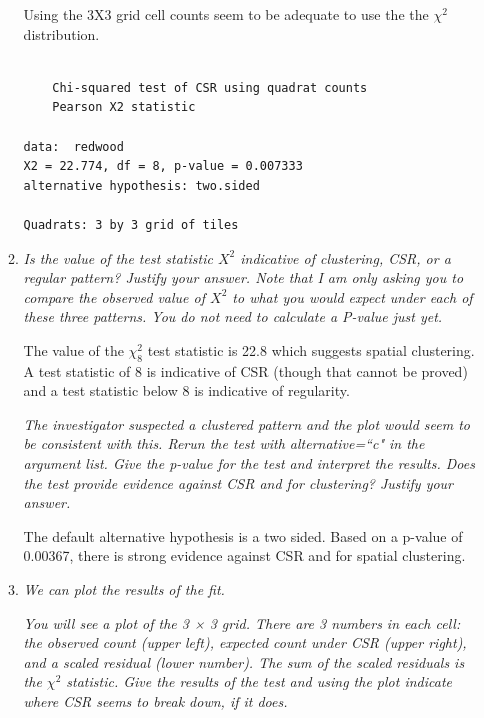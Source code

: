 \documentclass{article}\usepackage[]{graphicx}\usepackage[]{color}
\makeatletter
\newenvironment{kframe}{%
 \def\at@end@of@kframe{}%
 \ifinner\ifhmode%
  \def\at@end@of@kframe{\end{minipage}}%
  \begin{minipage}{\columnwidth}%
 \fi\fi%
 \def\FrameCommand##1{\hskip\@totalleftmargin \hskip-\fboxsep
 \colorbox{shadecolor}{##1}\hskip-\fboxsep
     \hskip-\linewidth \hskip-\@totalleftmargin \hskip\columnwidth}%
 \MakeFramed {\advance\hsize-\width
   \@totalleftmargin\z@ \linewidth\hsize
   \@setminipage}}%
 {\par\unskip\endMakeFramed%
 \at@end@of@kframe}
\newenvironment{knitrout}{}{} %
\makeatother
\begin{document}
\begin{enumerate}
\begin{enumerate}
Using the 3X3 grid cell counts seem to be adequate to use the the $\chi^{2}$ distribution.

\begin{knitrout}\footnotesize
{}\color{fgcolor}\begin{kframe}
\begin{verbatim}

	Chi-squared test of CSR using quadrat counts
	Pearson X2 statistic

data:  redwood
X2 = 22.774, df = 8, p-value = 0.007333
alternative hypothesis: two.sided

Quadrats: 3 by 3 grid of tiles
\end{verbatim}
\end{kframe}
\end{knitrout}

\item {\it Is the value of the test statistic $X^2$ indicative of clustering, CSR, or a regular pattern? Justify your answer. Note that I am only asking you to compare the observed value of $X^2$ to what you would expect under each of these three patterns. You do not need to calculate a P-value just yet.}

The value of the $\chi^{2}_{8}$ test statistic is 22.8 which suggests spatial clustering. A test statistic of 8 is indicative of CSR (though that cannot be proved) and a test statistic below 8 is indicative of regularity.

{\it The investigator suspected a clustered pattern and the plot would seem to be consistent with this. Rerun the test with alternative=``c" in the argument list. Give the p-value for the test and interpret the results. Does the test provide evidence against CSR and for clustering? Justify your answer.}


The default alternative hypothesis is a two sided. Based on a p-value of 0.00367, there is strong evidence against CSR and for spatial clustering. 


\item {\it We can plot the results of the fit.}

{\it You will see a plot of the 3 × 3 grid. There are 3 numbers in each cell: the observed count (upper left), expected count under CSR (upper right), and a scaled residual (lower number). The sum of the scaled residuals is the $\chi^{2}$ statistic. Give the results of the test and using the plot indicate where CSR seems to break down, if it does.}


\end{enumerate}
\end{enumerate}
\end{document}
